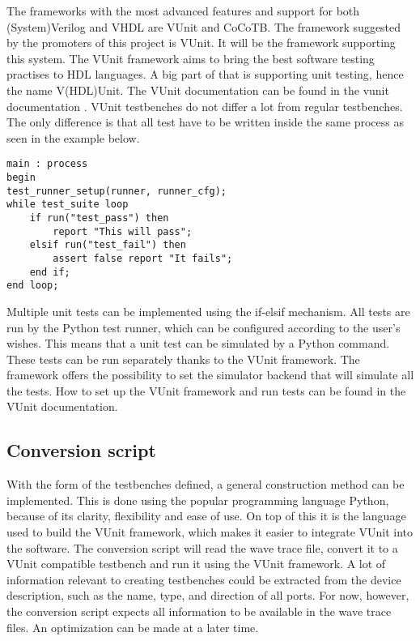 The frameworks with the most advanced features and support for both (System)Verilog and VHDL are VUnit and CoCoTB. The framework suggested by the promoters of this project is VUnit. It will be the framework supporting this system.
\npar
The VUnit framework aims to bring the best software testing practises to HDL languages. A big part of that is supporting unit testing, hence the name V(HDL)Unit. The VUnit documentation can be found in the vunit documentation \cite{vunit_doc}. VUnit testbenches do not differ a lot from regular testbenches. The only difference is that all test have to be written inside the same process as seen in the example below.
\begin{lstlisting}[style=vhdl, caption={Main test loop for a VUnit testbench}]
main : process
begin
test_runner_setup(runner, runner_cfg);
while test_suite loop
	if run("test_pass") then
		report "This will pass";
	elsif run("test_fail") then
		assert false report "It fails";
	end if;
end loop;
\end{lstlisting}\noindent
Multiple unit tests can be implemented using the if-elsif mechanism. All tests are run by the Python test runner, which can be configured according to the user's wishes. This means that a unit test can be simulated by a Python command. These tests can be run separately thanks to the VUnit framework. The framework offers the possibility to set the simulator backend that will simulate all the tests. How to set up the VUnit framework and run tests can be found in the VUnit documentation.
\subsection{Conversion script}
With the form of the testbenches defined, a general construction method can be implemented. This is done using the popular programming language Python, because of its clarity, flexibility and ease of use. On top of this it is the language used to build the VUnit framework, which makes it easier to integrate VUnit into the software.
\npar
The conversion script will read the wave trace file, convert it to a VUnit compatible testbench and run it using the VUnit framework.
\npar
A lot of information relevant to creating testbenches could be extracted from the device description, such as the name, type, and direction of all ports. For now, however, the conversion script expects all information to be available in the wave trace files. An optimization can be made at a later time.
